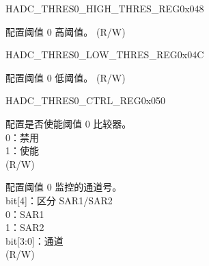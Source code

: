 \begin{register}{H}{ADC\_THRES0\_HIGH\_THRES\_REG}{0x048}\label{regdesc:ADCTHRES0HIGHTHRESREG}
%
%
\regnewline%
\begin{regdesc}\begin{reglist}
\label{fielddesc:ADCTHRES0HIGH}\item [ADC\_THRES0\_HIGH] 配置阈值 0 高阈值。 (R/W)
\end{reglist}\end{regdesc}
\end{register}


\begin{register}{H}{ADC\_THRES0\_LOW\_THRES\_REG}{0x04C}\label{regdesc:ADCTHRES0LOWTHRESREG}
%
%
\regnewline%
\begin{regdesc}\begin{reglist}
\label{fielddesc:ADCTHRES0LOW}\item [ADC\_THRES0\_LOW] 配置阈值 0 低阈值。 (R/W)
\end{reglist}\end{regdesc}
\end{register}


\begin{register}{H}{ADC\_THRES0\_CTRL\_REG}{0x050}\label{regdesc:ADCTHRES0CTRLREG}
%
%
%
\regnewline%
\begin{regdesc}\begin{reglist}
\label{fielddesc:ADCTHRES0EN}\item [ADC\_THRES0\_EN] 配置是否使能阈值 0 比较器。\\
0：禁用\\
1：使能\\
(R/W)
\label{fielddesc:ADCTHRES0CHANNEL}\item [ADC\_THRES0\_CHANNEL] 配置阈值 0 监控的通道号。\\
bit[4]：区分 SAR1/SAR2\\
0：SAR1\\
1：SAR2\\
bit[3:0]：通道\\
(R/W)
\end{reglist}\end{regdesc}
\end{register}


